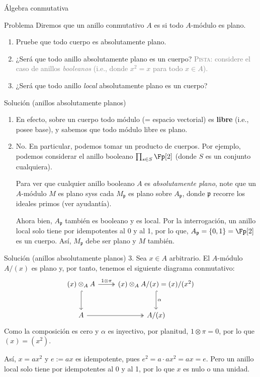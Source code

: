 \documentclass[10pt]{beamer}
\begin{document}
\begin{frame}{Álgebra conmutativa}
	\begin{block}{Problema}
		Diremos que un anillo conmutativo $A$ es  si todo $A$-módulo es plano.
		\begin{enumerate}
			\item Pruebe que todo cuerpo es absolutamente plano.
			\item ¿Será que todo anillo absolutamente plano es un cuerpo?
				\pause
				\textcolor{gray}{\textsc{Pista:} considere el caso de anillos \emph{booleanos} (i.e., donde $x^2 = x$
				para todo $x \in A$).}
			\item ¿Será que todo anillo \emph{local} absolutamente plano es un cuerpo?
		\end{enumerate}
	\end{block}
\end{frame}
\begin{frame}{Solución (anillos absolutamente planos)}
	\begin{enumerate}[wide]
		\item En efecto, sobre un cuerpo todo módulo (= espacio vectorial) es \textbf{libre} (i.e., posee base),
			y sabemos que todo módulo libre es plano.
		\item No. En particular, podemos tomar un producto de cuerpos.
			\pause
			Por ejemplo, podemos considerar el anillo booleano $\prod_{s\in S} \Fp[2]$ (donde $S$ es un conjunto
			cualquiera).

			\pause
			Para ver que cualquier anillo booleano $A$ es \emph{absolutamente plano}, note que un $A$-módulo
			$M$ es plano syss cada $M_{\mathfrak{p}}$ es plano sobre $A_{\mathfrak{p}}$, donde
			$\mathfrak{p}$ recorre los ideales primos (ver ayudantía).

			\pause
			Ahora bien, $A_{\mathfrak{p}}$ también es booleano y es local.
			Por la interrogación, un anillo local solo tiene por idempotentes al 0 y al 1, por lo que,
			$A_{\mathfrak{p}} = \{ 0, 1 \} = \Fp[2]$ es un cuerpo.
			Así, $M_{\mathfrak{p}}$ debe ser plano y $M$ también.
	\end{enumerate}
\end{frame}
\begin{frame}[fragile]{Solución (anillos absolutamente planos)}
	3. Sea $x \in A$ arbitrario.
	El $A$-módulo $A/(x)$ es plano y, por tanto, tenemos el siguiente diagrama conmutativo:
	\[\begin{tikzcd}[row sep=large]
		(x) \otimes_A A \rar["{1\otimes \pi}", two heads] \dar[hook] & (x) \otimes_A A/(x) = (x)/(x^2)
		\dar["\alpha", hook] \\
		A \rar[two heads] & A/(x)
	\end{tikzcd}\]
	\pause
	Como la composición es cero y $\alpha$ es inyectivo, por planitud, $1\otimes\pi = 0$, por lo que $(x) = (x^2)$.

	\pause
	Así, $x = ax^2$ y $e := ax$ es idempotente, pues $e^2 = a\cdot ax^2 = ax = e$.
	\pause
	Pero un anillo local solo tiene por idempotentes al 0 y al 1, por lo que $x$ es nulo o una unidad.
\end{frame}

\printbibliography
\end{document}
